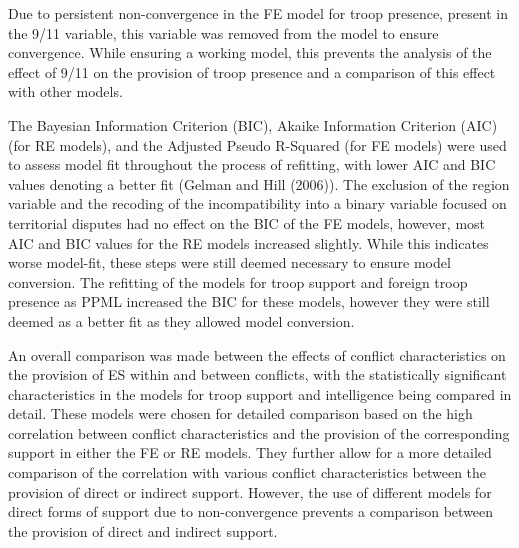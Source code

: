 \documentclass[
]{article}
\begin{document}
Due to persistent non-convergence in the FE model for troop presence,
present in the 9/11 variable, this variable was removed from the model
to ensure convergence. While ensuring a working model, this prevents the
analysis of the effect of 9/11 on the provision of troop presence and a
comparison of this effect with other models.

The Bayesian Information Criterion (BIC), Akaike Information Criterion
(AIC) (for RE models), and the Adjusted Pseudo R-Squared (for FE models)
were used to assess model fit throughout the process of refitting, with
lower AIC and BIC values denoting a better fit (Gelman and Hill (2006)).
The exclusion of the region variable and the recoding of the
incompatibility into a binary variable focused on territorial disputes
had no effect on the BIC of the FE models, however, most AIC and BIC
values for the RE models increased slightly. While this indicates worse
model-fit, these steps were still deemed necessary to ensure model
conversion. The refitting of the models for troop support and foreign
troop presence as PPML increased the BIC for these models, however they
were still deemed as a better fit as they allowed model conversion.

An overall comparison was made between the effects of conflict
characteristics on the provision of ES within and between conflicts,
with the statistically significant characteristics in the models for
troop support and intelligence being compared in detail. These models
were chosen for detailed comparison based on the high correlation
between conflict characteristics and the provision of the corresponding
support in either the FE or RE models. They further allow for a more
detailed comparison of the correlation with various conflict
characteristics between the provision of direct or indirect support.
However, the use of different models for direct forms of support due to
non-convergence prevents a comparison between the provision of direct
and indirect support.
\end{document}
